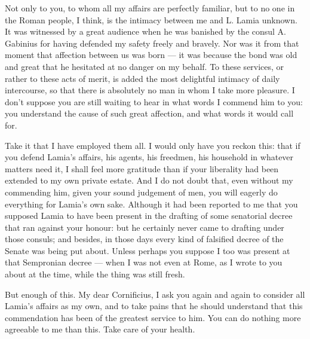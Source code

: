 

 Not only to you, to whom all my affairs are perfectly familiar, but to no one in the Roman people, I think, is the intimacy between me and L. Lamia unknown. It was witnessed by a great audience when he was banished by the consul A. Gabinius for having defended my safety freely and bravely. Nor was it from that moment that affection between us was born --- it was because the bond was old and great that he hesitated at no danger on my behalf. To these services, or rather to these acts of merit, is added the most delightful intimacy of daily intercourse, so that there is absolutely no man in whom I take more pleasure. I don't suppose you are still waiting to hear in what words I commend him to you: you understand the cause of such great affection, and what words it would call for.

 Take it that I have employed them all. I would only have you reckon this: that if you defend Lamia's affairs, his agents, his freedmen, his household in whatever matters need it, I shall feel more gratitude than if your liberality had been extended to my own private estate. And I do not doubt that, even without my commending him, given your sound judgement of men, you will eagerly do everything for Lamia's own sake. Although it had been reported to me that you supposed Lamia to have been present in the drafting of some senatorial decree that ran against your honour: but he certainly never came to drafting under those consuls; and besides, in those days every kind of falsified decree of the Senate was being put about. Unless perhaps you suppose I too was present at that Sempronian decree --- when I was not even at Rome, as I wrote to you about at the time, while the thing was still fresh.

 But enough of this. My dear Cornificius, I ask you again and again to consider all Lamia's affairs as my own, and to take pains that he should understand that this commendation has been of the greatest service to him. You can do nothing more agreeable to me than this. Take care of your health.
